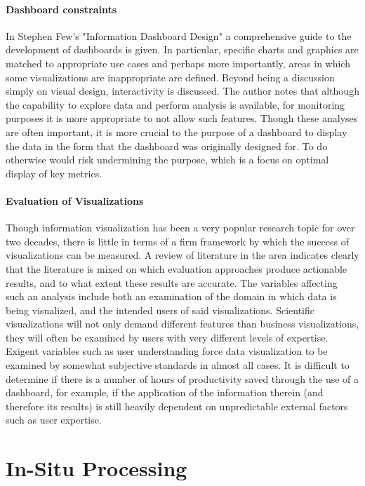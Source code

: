 \paragraph{Dashboard constraints}
In Stephen Few's "Information Dashboard Design" \cite{Few2006} a comprehensive guide to the development of dashboards is given. In particular, specific charts and graphics are matched to appropriate use cases and perhaps more importantly, areas in which some visualizations are inappropriate are defined. Beyond being a discussion simply on visual design, interactivity is discussed. The author notes that although the capability to explore data and perform analysis is available, for monitoring purposes it is more appropriate to not allow such features. Though these analyses are often important, it is more crucial to the purpose of a dashboard to display the data in the form that the dashboard was originally designed for. To do otherwise would risk undermining the purpose, which is a focus on optimal display of key metrics.

\paragraph{Evaluation of Visualizations}
Though information visualization has been a very popular research topic for over two decades, there is little in terms of a firm framework by which the success of visualizations can be measured. A review of literature in the area \cite{Amende2010} indicates clearly that the literature is mixed on which evaluation approaches produce actionable results, and to what extent these results are accurate. The variables affecting such an analysis include both an examination of the domain in which data is being visualized, and the intended users of said visualizations. Scientific visualizations will not only demand different features than business visualizations, they will often be examined by users with very different levels of expertise. Exigent variables such as user understanding force data visualization to be examined by somewhat subjective standards in almost all cases. It is difficult to determine if there is a number of hours of productivity saved through the use of a dashboard, for example, if the application of the information therein (and therefore its results) is still heavily dependent on unpredictable external factors such as user expertise. 


\section{In-Situ Processing}
\label{sec:insitu}

